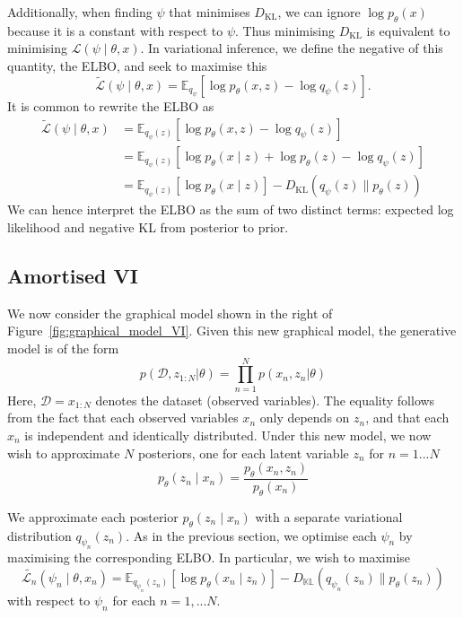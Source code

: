 \documentclass[12pt,a4paper]{report}
\begin{document}
Additionally, when finding $\psi$ that minimises $D_{\text{KL}}$, we can ignore $\log p_\theta(x)$ because it is a constant with respect to $\psi$. Thus minimising $D_{\text{KL}}$ is equivalent to minimising ${\mathcal{L}}(\psi \mid \theta, x)$. In variational inference, we define the negative of this quantity, the ELBO, and seek to maximise this 
$$ \tilde{\mathcal{L}}(\psi \mid \theta, x)= \mathbb{E}_{q_\psi} [\log p_\theta(x, z) - \log q_\psi(z)]. $$
It is common to rewrite the ELBO as 
\begin{align}
\tilde{\mathcal{L}}(\psi \mid \theta, x) &= \mathbb{E}_{q_\psi(z)} [\log p_\theta(x, z) - \log q_\psi(z)] \nonumber \\
&= \mathbb{E}_{q_\psi(z)} [\log p_\theta(x \mid z) + \log p_\theta(z) - \log q_\psi(z)] \nonumber \\
&= \mathbb{E}_{q_\psi(z)} [\log p_\theta(x \mid z)] - D_{\text{KL}} (q_\psi(z) \parallel p_\theta(z)) \label{eq:KL_term)_in_ELBO}
\end{align}
We can hence interpret the ELBO as the sum of two distinct terms: expected log likelihood and negative KL from posterior to prior.

\subsection{Amortised VI}
We now consider the graphical model shown in the right of Figure~\ref{fig:graphical_model_VI}. 
Given this new graphical model, the generative model is of the form
$$ p(\mathcal{D}, z_{1:N} | \theta) = \prod_{n=1}^N p(x_n, z_n | \theta)$$
Here, $\mathcal{D}=x_{1:N}$ denotes the dataset (observed variables). The equality follows from the fact that each observed variables $x_n$ only depends on $z_n$, and that each $x_n$ is independent and identically distributed. Under this new model, we now wish to approximate $N$ posteriors, one for each latent variable $z_n$ for $n = 1...N$
\begin{equation}
\label{eq:latent_model_posterior}
    p_\theta(z_n \mid x_n) = \frac{p_\theta(x_n, z_n)}{p_\theta(x_n)}
\end{equation}

We approximate each posterior $p_\theta(z_n \mid x_n)$ with a separate variational distribution $q_{\psi_n}(z_n)$. 
As in the previous section, we optimise each $\psi_n$ by maximising the corresponding ELBO. 
In particular, we wish to maximise 
$$\tilde{\mathcal{L}_n}(\psi_n \mid \theta, x_n) = \mathbb{E}_{q_{\psi_n}(z_n)} [\log p_\theta(x_n \mid z_n)] - D_{\mathbb{KL}} (q_{\psi_n}(z_n) \parallel p_\theta(z_n))$$ 
with respect to $\psi_n$ for each $n=1,...N$. 
\end{document}
